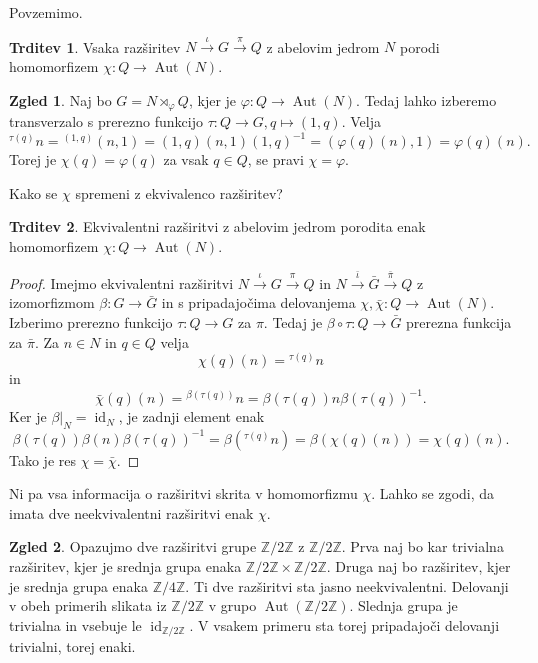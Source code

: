 \documentclass[11pt]{book}
\def\ZZ{\mathbb{Z}}
\DeclareMathOperator\Aut{Aut}
\DeclareMathOperator\id{id}
\def\vprasanje{\color{oranzna}}
\theoremstyle{definition}
\theoremstyle{zgled}
\newtheorem*{zgled}{Zgled}
\theoremstyle{odprtproblem}
\theoremstyle{domacanaloga}
\newenvironment{dokaz}
    {\color{siva}\begin{proof}}
    {\end{proof}}
\theoremstyle{izrek}
\newtheorem*{trditev}{Trditev}
\begin{document}
Povzemimo.

\begin{trditev}
Vsaka razširitev $N \xrightarrow{\iota} G \xrightarrow{\pi} Q$ z abelovim jedrom $N$ porodi homomorfizem $\chi \colon Q \to \Aut(N)$.
\end{trditev}

\begin{zgled}
Naj bo $G = N \rtimes_\varphi Q$, kjer je $\varphi \colon Q \to \Aut(N)$. Tedaj lahko izberemo transverzalo s prerezno funkcijo $\tau \colon Q \to G, q \mapsto (1,q)$. Velja 
\[
{}^{\tau(q)} n = {}^{(1,q)} (n,1) = (1,q)(n,1)(1,q)^{-1} = (\varphi(q)(n), 1) = \varphi(q)(n).
\]
Torej je $\chi(q) = \varphi(q)$ za vsak $q \in Q$, se pravi $\chi = \varphi$.
\end{zgled}

{\vprasanje Kako se $\chi$ spremeni z ekvivalenco razširitev?}

\begin{trditev}
Ekvivalentni razširitvi z abelovim jedrom porodita enak homomorfizem $\chi \colon Q \to \Aut(N)$.
\end{trditev}

\begin{dokaz}
Imejmo ekvivalentni razširitvi $N \xrightarrow{\iota} G \xrightarrow{\pi} Q$ in $ N \xrightarrow{\bar \iota} \bar G \xrightarrow{\bar \pi} Q$ z izomorfizmom $\beta \colon G \to \bar G$ in s pripadajočima delovanjema $\chi, \bar \chi \colon Q \to \Aut(N)$. Izberimo prerezno funkcijo $\tau \colon Q \to G$ za $\pi$. Tedaj je $\beta \circ \tau \colon Q \to \bar G$ prerezna funkcija za $\bar \pi$. Za $n \in N$ in $q \in Q$ velja
\[
\chi(q)(n) = {}^{\tau(q)} n
\]
in
\[
\bar \chi(q)(n) = {}^{\beta(\tau(q))} n = \beta(\tau(q)) n \beta(\tau(q))^{-1}.
\]
Ker je $\beta |_N = \id_N$, je zadnji element enak
\[
\beta(\tau(q)) \beta(n) \beta(\tau(q))^{-1} = \beta({}^{\tau(q)} n) = \beta(\chi(q)(n)) = \chi(q)(n).
\]
Tako je res $\chi = \bar \chi$.
\end{dokaz}

Ni pa vsa informacija o razširitvi skrita v homomorfizmu $\chi$. Lahko se zgodi, da imata dve neekvivalentni razširitvi enak $\chi$.

\begin{zgled}
Opazujmo dve razširitvi grupe $\ZZ/2\ZZ$ z $\ZZ/2\ZZ$. Prva naj bo kar trivialna razširitev, kjer je srednja grupa enaka $\ZZ/2\ZZ \times \ZZ/2\ZZ$. Druga naj bo razširitev, kjer je srednja grupa enaka $\ZZ/4\ZZ$. Ti dve razširitvi sta jasno neekvivalentni. Delovanji v obeh primerih slikata iz $\ZZ/2\ZZ$ v grupo $\Aut(\ZZ/2\ZZ)$. Slednja grupa je trivialna in vsebuje le $\id_{\ZZ/2\ZZ}$. V vsakem primeru sta torej pripadajoči delovanji trivialni, torej enaki.
\end{zgled}
\end{document}
